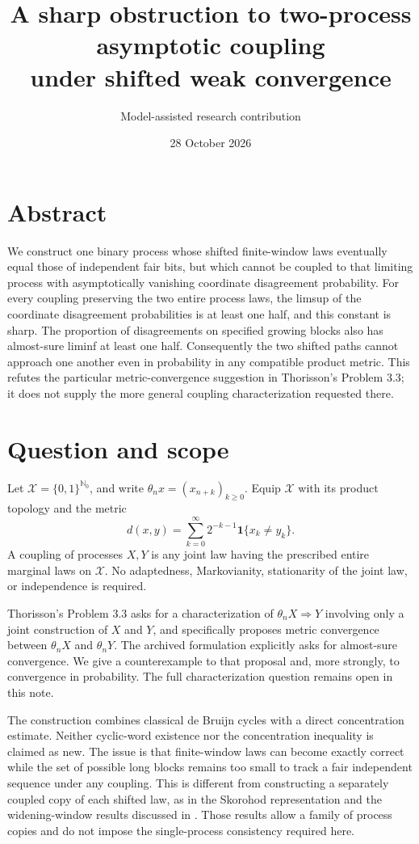 \documentclass[11pt]{article}
\title{A sharp obstruction to two-process asymptotic coupling\\under shifted weak convergence}
\author{Model-assisted research contribution}
\date{28 October 2026}
\newcommand{\ind}{\mathbf 1}
\begin{document}
\maketitle

\section*{Abstract}
We construct one binary process whose shifted finite-window laws eventually equal those of independent fair bits, but which cannot be coupled to that limiting process with asymptotically vanishing coordinate disagreement probability. For every coupling preserving the two entire process laws, the limsup of the coordinate disagreement probabilities is at least one half, and this constant is sharp. The proportion of disagreements on specified growing blocks also has almost-sure liminf at least one half. Consequently the two shifted paths cannot approach one another even in probability in any compatible product metric. This refutes the particular metric-convergence suggestion in Thorisson's Problem 3.3; it does not supply the more general coupling characterization requested there.


\section{Question and scope}

Let \(\mathcal X=\{0,1\}^{\mathbb N_0}\), and write
\(\theta_n x=(x_{n+k})_{k\geq0}\). Equip \(\mathcal X\) with its product topology and the metric
\[
 d(x,y)=\sum_{k=0}^{\infty}2^{-k-1}\ind\{x_k\ne y_k\}.
\]
A coupling of processes \(X,Y\) is any joint law having the prescribed entire marginal laws on \(\mathcal X\). No adaptedness, Markovianity, stationarity of the joint law, or independence is required.

Thorisson's Problem 3.3 \cite[p.~4]{thorisson} asks for a characterization of \(\theta_nX\Rightarrow Y\) involving only a joint construction of \(X\) and \(Y\), and specifically proposes metric convergence between \(\theta_nX\) and \(\theta_nY\). The archived formulation \cite{archive} explicitly asks for almost-sure convergence. We give a counterexample to that proposal and, more strongly, to convergence in probability. The full characterization question remains open in this note.

The construction combines classical de Bruijn cycles with a direct concentration estimate. Neither cyclic-word existence nor the concentration inequality is claimed as new. The issue is that finite-window laws can become exactly correct while the set of possible long blocks remains too small to track a fair independent sequence under any coupling. This is different from constructing a separately coupled copy of each shifted law, as in the Skorohod representation and the widening-window results discussed in \cite[Section~1]{windows}. Those results allow a family of process copies and do not impose the single-process consistency required here.
\end{document}
